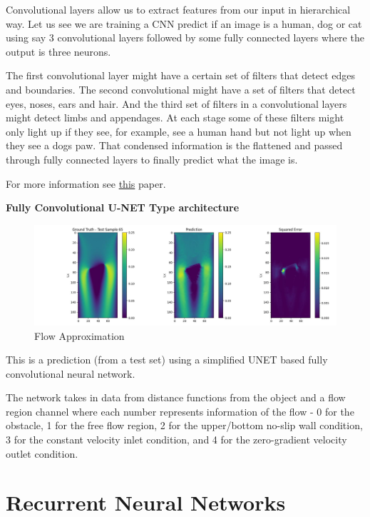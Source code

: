 \documentclass[
]{article}
\begin{document}
Convolutional layers allow us to extract features from our input in hierarchical way. Let us see we are training a CNN predict if an image is a human, dog or cat using say 3 convolutional layers followed by some fully connected layers where the output is three neurons.

The first convolutional layer might have a certain set of filters that detect edges and boundaries. The second convolutional might have a set of filters that detect eyes, noses, ears and hair. And the third set of filters in a convolutional layers might detect limbs and appendages. At each stage some of these filters might only light up if they see, for example, see a human hand but not light up when they see a dogs paw. That condensed information is the flattened and passed through fully connected layers to finally predict what the image is.

For more information see \href{https://yosinski.com/media/papers/Yosinski__2015__ICML_DL__Understanding_Neural_Networks_Through_Deep_Visualization__.pdf}{this} paper.

\textbf{Fully Convolutional U-NET Type architecture}

\begin{figure}
\centering
\includegraphics{CNN_Fluids/figures/testset.jpg}
\caption{Flow Approximation}
\end{figure}

This is a prediction (from a test set) using a simplified UNET based fully convolutional neural network.

The network takes in data from distance functions from the object and a flow region channel where each number represents information of the flow - 0 for the obstacle, 1 for the free flow region, 2 for the upper/bottom no-slip wall condition, 3 for the constant velocity inlet condition, and 4 for the zero-gradient velocity outlet condition.

\section{Recurrent Neural Networks}\label{recurrent-neural-networks}
\end{document}
